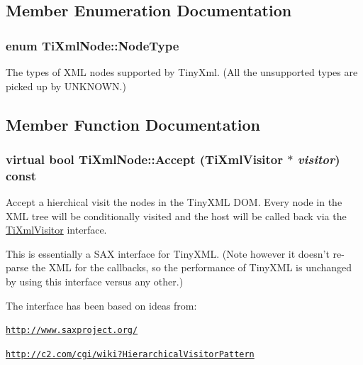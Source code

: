 \subsection{Member Enumeration Documentation}
\hypertarget{class_ti_xml_node_a836eded4920ab9e9ef28496f48cd95a2}{
\subsubsection[{NodeType}]{\setlength{\rightskip}{0pt plus 5cm}enum {\bf TiXmlNode::NodeType}}}
\label{class_ti_xml_node_a836eded4920ab9e9ef28496f48cd95a2}
The types of XML nodes supported by TinyXml. (All the unsupported types are picked up by UNKNOWN.) 

\subsection{Member Function Documentation}
\hypertarget{class_ti_xml_node_acc0f88b7462c6cb73809d410a4f5bb86}{
\subsubsection[{Accept}]{\setlength{\rightskip}{0pt plus 5cm}virtual bool TiXmlNode::Accept ({\bf TiXmlVisitor} $\ast$ {\em visitor}) const}}
\label{class_ti_xml_node_acc0f88b7462c6cb73809d410a4f5bb86}
Accept a hierchical visit the nodes in the TinyXML DOM. Every node in the XML tree will be conditionally visited and the host will be called back via the \hyperlink{class_ti_xml_visitor}{TiXmlVisitor} interface.

This is essentially a SAX interface for TinyXML. (Note however it doesn't re-\/parse the XML for the callbacks, so the performance of TinyXML is unchanged by using this interface versus any other.)

The interface has been based on ideas from:


\begin{DoxyItemize}
\item \href{http://www.saxproject.org/}{\tt http://www.saxproject.org/}
\item \href{http://c2.com/cgi/wiki?HierarchicalVisitorPattern}{\tt http://c2.com/cgi/wiki?HierarchicalVisitorPattern}
\end{DoxyItemize}

